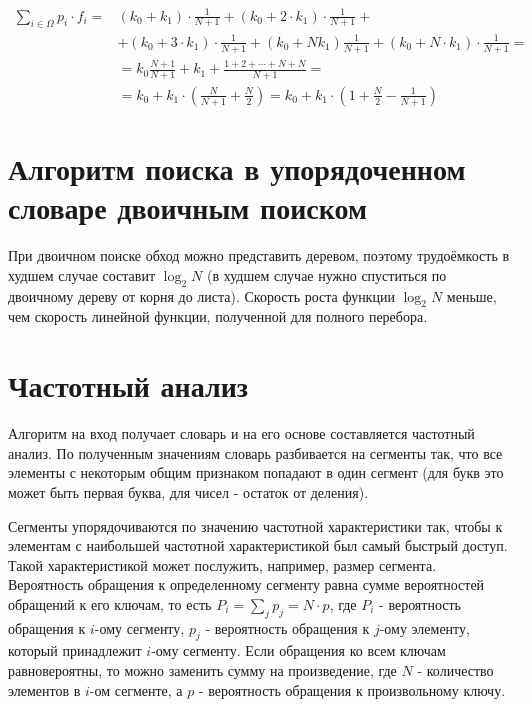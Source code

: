 \begin{equation}
    \label{for:brute}
    \begin{aligned}
        \sum\limits_{i \in \Omega} p_i \cdot f_i = & (k_0 + k_1) \cdot \frac{1}{N + 1} + (k_0 + 2 \cdot k_1) \cdot \frac{1}{N+1} +\\
        & + (k_0 + 3 \cdot k_1) \cdot \frac{1}{N + 1} + (k_0 + Nk_1)\frac{1}{N + 1} + (k_0 + N \cdot k_1) \cdot \frac{1}{N + 1} =\\
        & = k_0\frac{N+1}{N+1}+k_1+\frac{1 + 2 + \cdots + N + N}{N + 1} = \\
        & = k_0 + k_1 \cdot \left(\frac{N}{N + 1} + \frac{N}{2}\right) = k_0 + k_1 \cdot \left(1 + \frac{N}{2} - \frac{1}{N + 1}\right)
    \end{aligned}
\end{equation}

\section{Алгоритм поиска в упорядоченном словаре двоичным поиском}

При двоичном поиске \cite{binary} обход можно представить деревом, поэтому трудоёмкость в худшем случае составит $\log_2 N$ (в худшем случае нужно спуститься по двоичному дереву от корня до листа). Скорость роста функции $\log_2 N$ меньше, чем скорость линейной функции, полученной для полного перебора.

\section{Частотный анализ}
Алгоритм на вход получает словарь и на его основе составляется частотный анализ. По полученным значениям словарь разбивается на сегменты так, что все элементы с некоторым общим признаком попадают в один сегмент (для букв это может быть первая буква, для чисел - остаток от деления). 

Сегменты упорядочиваются по значению частотной характеристики так, чтобы к элементам с наибольшей частотной характеристикой был самый быстрый доступ. Такой характеристикой может послужить, например, размер сегмента. Вероятность обращения к определенному сегменту равна сумме вероятностей обращений к его ключам, то есть $P_i = \sum_{j}p_j = N \cdot p$, где $P_i$ - вероятность обращения к $i$-ому сегменту, $p_j$ - вероятность обращения к $j$-ому элементу, который принадлежит $i$-ому сегменту. Если обращения ко всем ключам равновероятны, то можно заменить сумму на произведение, где $N$ - количество элементов в $i$-ом сегменте, а $p$ - вероятность обращения к произвольному ключу.

